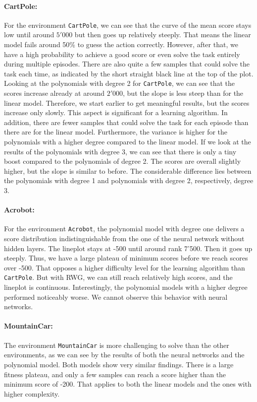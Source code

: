 \paragraph*{CartPole:} For the environment \verb|CartPole|, we can see that the curve of the mean score stays low until around $5'000$ but then goes up relatively steeply. That means the linear model fails around 50\% to guess the action correctly. However, after that, we have a high probability to achieve a good score or even solve the task entirely during multiple episodes. There are also quite a few samples that could solve the task each time, as indicated by the short straight black line at the top of the plot. Looking at the polynomials with degree 2 for \verb|CartPole|, we can see that the scores increase already at around $2'000$, but the slope is less steep than for the linear model. Therefore, we start earlier to get meaningful results, but the scores increase only slowly. This aspect is significant for a learning algorithm. In addition, there are fewer samples that could solve the task for each episode than there are for the linear model. Furthermore, the variance is higher for the polynomials with a higher degree compared to the linear model. If we look at the results of the polynomials with degree 3, we can see that there is only a tiny boost compared to the polynomials of degree 2. The scores are overall slightly higher, but the slope is similar to before. The considerable difference lies between the polynomials with degree 1 and polynomials with degree 2, respectively, degree 3.

\paragraph*{Acrobot:} For the environment \verb|Acrobot|, the polynomial model with degree one delivers a score distribution indistinguishable from the one of the neural network without hidden layers. The lineplot stays at -500 until around rank 7'500. Then it goes up steeply. Thus, we have a large plateau of minimum scores before we reach scores over -500. That opposes a higher difficulty level for the learning algorithm than \verb|CartPole|. But with RWG, we can still reach relatively high scores, and the lineplot is continuous. Interestingly, the polynomial models with a higher degree performed noticeably worse. We cannot observe this behavior with neural networks.

\paragraph*{MountainCar:} The environment \verb|MountainCar| is more challenging to solve than the other environments, as we can see by the results of both the neural networks and the polynomial model. Both models show very similar findings. There is a large fitness plateau, and only a few samples can reach a score higher than the minimum score of -200. That applies to both the linear models and the ones with higher complexity.

